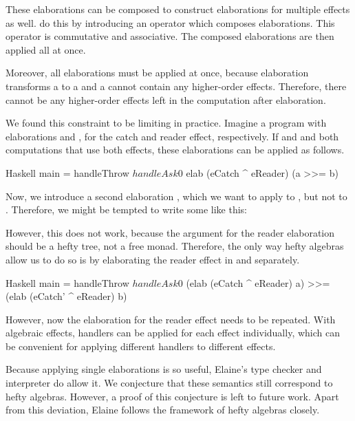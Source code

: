 These elaborations can be composed to construct elaborations for multiple effects as well. \textcite{bach_poulsen_hefty_2023} do this by introducing an operator \hs{^} which composes elaborations. This operator is commutative and associative. The composed elaborations are then applied all at once. 

Moreover, all elaborations must be applied at once, because elaboration transforms a  to a  and a  cannot contain any higher-order effects. Therefore, there cannot be any higher-order effects left in the computation after elaboration.

We found this constraint to be limiting in practice. Imagine a program with elaborations  and , for the catch and reader effect, respectively. If  and  and both computations that use both effects, these elaborations can be applied as follows.

\begin{lst}{Haskell}
main = handleThrow $ handleAsk 0 $
  elab (eCatch ^ eReader) (a >>= b)
\end{lst}
%
Now, we introduce a second elaboration , which we want to apply to , but not to . Therefore, we might be tempted to write some like this:

%
However, this does not work, because the argument for the reader elaboration should be a hefty tree, not a free monad. Therefore, the only way hefty algebras allow us to do so is by elaborating the reader effect in  and  separately.

\begin{lst}{Haskell}
main = handleThrow $ handleAsk 0 $
  (elab (eCatch ^ eReader) a)
    >>= (elab (eCatch' ^ eReader) b)
\end{lst}
%
However, now the elaboration for the reader effect needs to be repeated. With algebraic effects, handlers can be applied for each effect individually, which can be convenient for applying different handlers to different effects.

Because applying single elaborations is so useful, Elaine's type checker and interpreter do allow it. We conjecture that these semantics still correspond to hefty algebras. However, a proof of this conjecture is left to future work. Apart from this deviation, Elaine follows the framework of hefty algebras closely.


